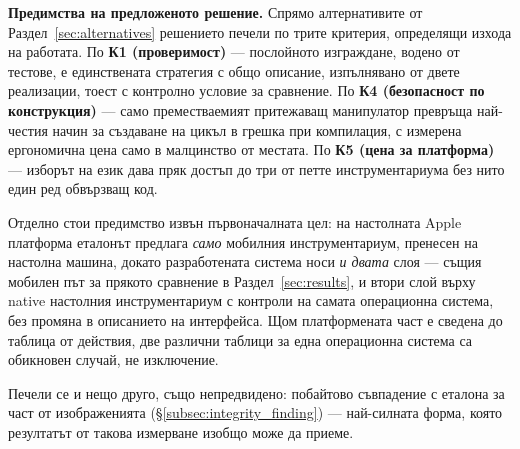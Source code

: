 \textbf{Предимства на предложеното решение.}
Спрямо алтернативите от Раздел~\ref{sec:alternatives} решението печели по трите критерия,
определящи изхода на работата. По \textbf{К1 (проверимост)} --- послойното изграждане, водено от
тестове, е единствената стратегия с общо описание, изпълнявано от двете реализации, тоест с
контролно условие за сравнение. По \textbf{К4 (безопасност по конструкция)} --- само
преместваемият притежаващ манипулатор превръща най-честия начин за създаване на цикъл в грешка
при компилация, с измерена ергономична цена само в малцинство от местата. По \textbf{К5 (цена за
платформа)}
--- изборът на език дава пряк достъп до три от петте инструментариума без нито един ред обвързващ
код.

Отделно стои предимство извън първоначалната цел: на настолната Apple платформа еталонът предлага
\emph{само} мобилния инструментариум, пренесен на настолна машина, докато разработената система
носи \emph{и двата} слоя --- същия мобилен път за прякото сравнение в Раздел~\ref{sec:results}, и
втори слой върху native настолния инструментариум с контроли на самата операционна система, без
промяна в описанието на интерфейса. Щом платформената част е сведена до таблица от действия, две
различни таблици за една операционна система са обикновен случай, не изключение.

Печели се и нещо друго, също непредвидено: побайтово съвпадение с еталона за част от изображенията
(§\ref{subsec:integrity_finding}) --- най-силната форма, която резултатът от такова измерване
изобщо може да приеме.


